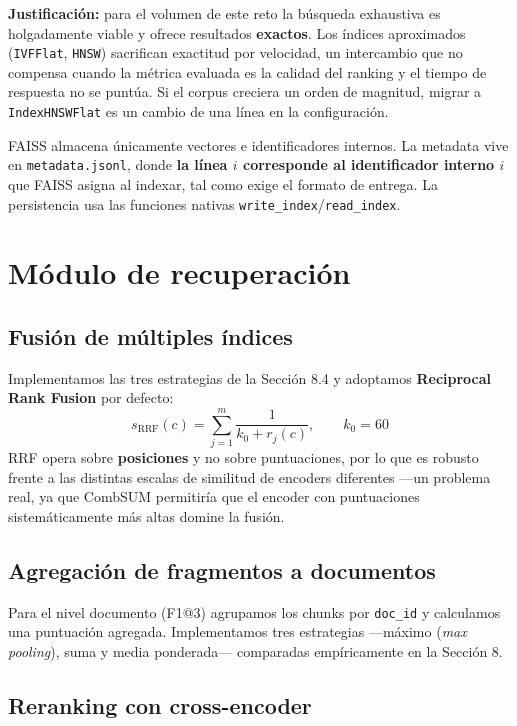 \documentclass[10pt,a4paper]{article}
\begin{document}
\textbf{Justificación:} para el volumen de este reto la búsqueda exhaustiva es holgadamente viable
y ofrece resultados \textbf{exactos}. Los índices aproximados (\texttt{IVFFlat}, \texttt{HNSW})
sacrifican exactitud por velocidad, un intercambio que no compensa cuando la métrica evaluada es la
calidad del ranking y el tiempo de respuesta no se puntúa. Si el corpus creciera un orden de
magnitud, migrar a \texttt{IndexHNSWFlat} es un cambio de una línea en la configuración.

FAISS almacena únicamente vectores e identificadores internos. La metadata vive en
\texttt{metadata.jsonl}, donde \textbf{la línea $i$ corresponde al identificador interno $i$} que
FAISS asigna al indexar, tal como exige el formato de entrega. La persistencia usa las funciones
nativas \texttt{write\_index}/\texttt{read\_index}.

\section{Módulo de recuperación}

\subsection{Fusión de múltiples índices}

Implementamos las tres estrategias de la Sección 8.4 y adoptamos \textbf{Reciprocal Rank Fusion}
por defecto:
\[ s_{\mathrm{RRF}}(c) = \sum_{j=1}^{m} \frac{1}{k_0 + r_j(c)}, \qquad k_0 = 60 \]
RRF opera sobre \textbf{posiciones} y no sobre puntuaciones, por lo que es robusto frente a las
distintas escalas de similitud de encoders diferentes —un problema real, ya que CombSUM permitiría
que el encoder con puntuaciones sistemáticamente más altas domine la fusión.

\subsection{Agregación de fragmentos a documentos}

Para el nivel documento (F1@3) agrupamos los chunks por \texttt{doc\_id} y calculamos una
puntuación agregada. Implementamos tres estrategias —máximo (\emph{max pooling}), suma y media
ponderada— comparadas empíricamente en la Sección 8.

\subsection{Reranking con cross-encoder}
\end{document}
